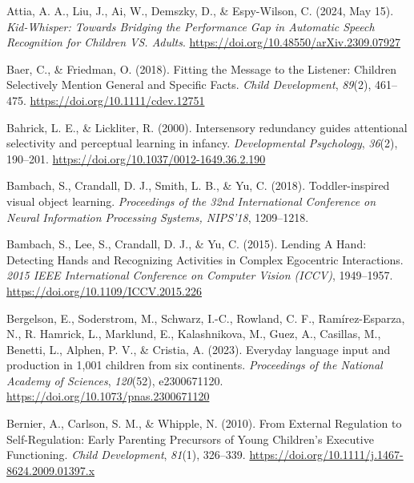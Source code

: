 \documentclass[
  english,
  12pt,
  man,floatsintext]{apa6}
\newlength{\cslhangindent}
\newenvironment{CSLReferences}[2] %
 {\begin{list}{}{%
  \setlength{\itemindent}{0pt}
  \setlength{\leftmargin}{0pt}
  \setlength{\parsep}{0pt}
  \ifodd #1
   \setlength{\leftmargin}{\cslhangindent}
   \setlength{\itemindent}{-1\cslhangindent}
  \fi
  \setlength{\itemsep}{#2\baselineskip}}}
 {\end{list}}
\begin{document}
\protect{}\label{refs}
\begin{CSLReferences}{1}{0}
Attia, A. A., Liu, J., Ai, W., Demszky, D., \& Espy-Wilson, C. (2024, May 15). \emph{Kid-{Whisper}: {Towards Bridging} the {Performance Gap} in {Automatic Speech Recognition} for {Children VS}. {Adults}}. \url{https://doi.org/10.48550/arXiv.2309.07927}

Baer, C., \& Friedman, O. (2018). Fitting the {Message} to the {Listener}: {Children Selectively Mention General} and {Specific Facts}. \emph{Child Development}, \emph{89}(2), 461--475. \url{https://doi.org/10.1111/cdev.12751}

Bahrick, L. E., \& Lickliter, R. (2000). Intersensory redundancy guides attentional selectivity and perceptual learning in infancy. \emph{Developmental Psychology}, \emph{36}(2), 190--201. \url{https://doi.org/10.1037/0012-1649.36.2.190}

Bambach, S., Crandall, D. J., Smith, L. B., \& Yu, C. (2018). Toddler-inspired visual object learning. \emph{Proceedings of the 32nd International Conference on Neural Information Processing Systems, {NIPS}'18}, 1209--1218.

Bambach, S., Lee, S., Crandall, D. J., \& Yu, C. (2015). Lending {A Hand}: {Detecting Hands} and {Recognizing Activities} in {Complex Egocentric Interactions}. \emph{2015 {IEEE International Conference} on {Computer Vision} ({ICCV})}, 1949--1957. \url{https://doi.org/10.1109/ICCV.2015.226}

Bergelson, E., Soderstrom, M., Schwarz, I.-C., Rowland, C. F., Ramírez-Esparza, N., R. Hamrick, L., Marklund, E., Kalashnikova, M., Guez, A., Casillas, M., Benetti, L., Alphen, P. V., \& Cristia, A. (2023). Everyday language input and production in 1,001 children from six continents. \emph{Proceedings of the National Academy of Sciences}, \emph{120}(52), e2300671120. \url{https://doi.org/10.1073/pnas.2300671120}

Bernier, A., Carlson, S. M., \& Whipple, N. (2010). From {External Regulation} to {Self-Regulation}: {Early Parenting Precursors} of {Young Children}'s {Executive Functioning}. \emph{Child Development}, \emph{81}(1), 326--339. \url{https://doi.org/10.1111/j.1467-8624.2009.01397.x}


\end{CSLReferences}
\end{document}
